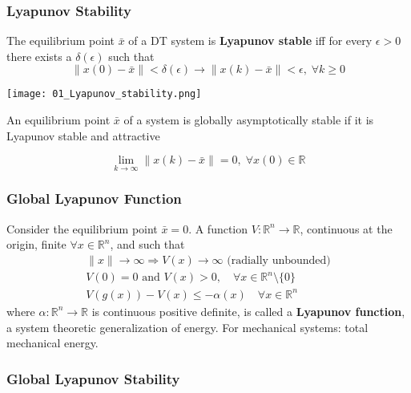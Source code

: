 \subsubsection{Lyapunov Stability}
The equilibrium point $\bar{x}$ of a DT system is \textbf{Lyapunov stable} iff for every $\epsilon >0$ there exists a $\delta(\epsilon)$ such that
\begin{equation*}
    \lVert x(0) - \bar{x} \rVert < \delta(\epsilon) \to \lVert x(k) - \bar{x} \rVert < \epsilon, \; \forall k \geq 0
\end{equation*}

\begin{center}
    \texttt{[image: 01\_Lyapunov\_stability.png]}
\end{center}


An equilibrium point $\bar{x}$ of a system is globally asymptotically stable if it is Lyapunov stable and attractive

\begin{equation*}
    \lim_{k\to\infty} \lVert x(k) - \bar{x} \rVert = 0, \; \forall x(0) \in \mathbb{R}
\end{equation*}


\subsubsection{Global Lyapunov Function}

Consider the equilibrium point $\bar{x}=0$. A function $V:\mathbb{R}^n\to \mathbb{R}$, continuous at the origin, finite $\forall x \in \mathbb{R}^n$, and such that
\begin{gather*}
    \lVert x \rVert \to \infty \Rightarrow V(x) \to \infty \text{ (radially unbounded)}\\
    V(0)=0 \text{ and } V(x)>0, \quad \forall x \in \mathbb{R}^n \setminus\{0\}\\
    V(g(x)) - V(x) \leq -\alpha(x) \quad \forall x \in \mathbb{R}^n
\end{gather*}
where $\alpha:\mathbb{R}^n\to \mathbb{R}$ is continuous positive definite, is called a \textbf{Lyapunov function}, a system theoretic generalization of energy. For mechanical systems: total mechanical energy.

\subsubsection{Global Lyapunov Stability}

